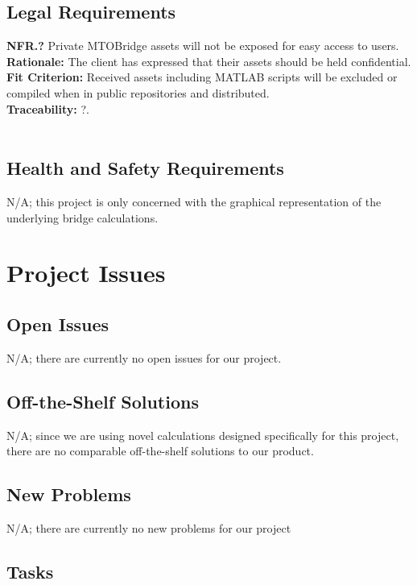 \documentclass[12pt]{article}
\begin{document}
\subsection{Legal Requirements}

  \textbf{NFR.?} Private MTOBridge assets will not be exposed for easy access to users.\\
  \textbf{Rationale:} The client has expressed that their assets should be held confidential.\\
  \textbf{Fit Criterion:} Received assets including MATLAB scripts will be excluded or compiled when in public repositories and distributed.\\
  \textbf{Traceability:} ?.\\\\

\subsection{Health and Safety Requirements}

N/A; this project is only concerned with the graphical representation of the underlying bridge calculations.\\

\section{Project Issues}

\subsection{Open Issues}

N/A; there are currently no open issues for our project.

\subsection{Off-the-Shelf Solutions}

N/A; since we are using novel calculations designed specifically for this project, there are no comparable off-the-shelf solutions to our product.

\subsection{New Problems}

N/A; there are currently no new problems for our project

\subsection{Tasks}
\end{document}
